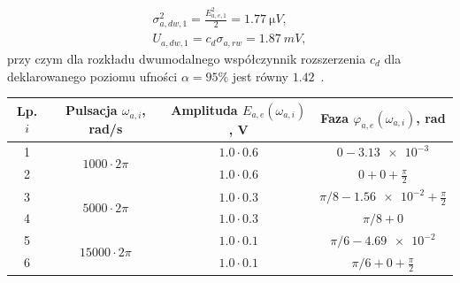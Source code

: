 \begin{gather}
\sigma_{a,dw,1}^{2} = \frac{E_{a,e,1}^{2}}{2} = \qty{1.77}{\micro V} \label{eq:sym_parta_dyn_self_var}, \\
U_{a,dw,1} = c_{d} \sigma_{a,rw} = \qty{1.87}{mV} \label{eq:sym_parta_dyn_self_unc},
\end{gather}
przy czym dla rozkładu dwumodalnego współczynnik rozszerzenia $c_{d}$ dla deklarowanego poziomu ufności $\alpha = 95\%$ jest równy $1.42$~\cite{jakubiec_system}.

\begin{table}[htb!]
\begin{center}
\begin{tabular}[c]{| c | c | c | c |} \hline
\textbf{Lp. $i$} & \textbf{Pulsacja $\omega_{a,i}$, rad/s} & \textbf{Amplituda $E_{a,e}(\omega_{a,i})$, V} & \textbf{Faza $\varphi_{a,e}(\omega_{a,i})$, rad} \\ \hline
1 & \multirow{2}{*}{$1000  \cdot 2\pi$} &  $1.0 \cdot 0.6$       & $0 - \num{3.13e-3}$                      \\ \cline{1-1} \cline{3-4}
2 &                                     &  $1.0 \cdot 0.6$       & $0 + 0 + \frac{\pi}{2}$                  \\ \hline
3 & \multirow{2}{*}{$5000  \cdot 2\pi$} &  $1.0 \cdot 0.3$       & $\pi/8 - \num{1.56e-2} + \frac{\pi}{2}$  \\ \cline{1-1} \cline{3-4}
4 &                                     &  $1.0 \cdot 0.3$       & $\pi/8 + 0$                              \\ \hline
5 & \multirow{2}{*}{$15000 \cdot 2\pi$} &  $1.0 \cdot 0.1$       & $\pi/6 - \num{4.69e-2}$                  \\ \cline{1-1} \cline{3-4}
6 &                                     &  $1.0 \cdot 0.1$       & $\pi/6 + 0 + \frac{\pi}{2}$              \\ \hline
\end{tabular}
\end{center}
\end{table}

